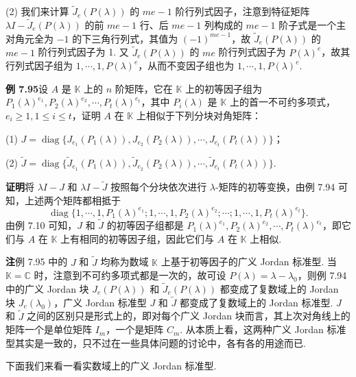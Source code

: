 \documentclass[UTF8, 12pt, fontset=fandol, oneside]{ctexart}
\begin{document}
(2) 我们来计算 $\widetilde J_e(P(\lambda))$ 的 $me-1$ 阶行列式因子，注意到特征矩阵 $\lambda I-\widetilde J_e(P(\lambda))$ 的前 $me-1$ 行、后 $me-1$ 列构成的 $me-1$ 阶子式是一个主对角元全为 $-1$ 的下三角行列式，其值为 $(-1)^{me-1}$，故 $\widetilde J_e(P(\lambda))$ 的 $me-1$ 阶行列式因子为 1. 又 $\widetilde J_e(P(\lambda))$ 的 $me$ 阶行列式因子为 $P(\lambda)^e$，故其行列式因子组为 $1,\cdots,1,P(\lambda)^e$，从而不变因子组也为 $1,\cdots,1,P(\lambda)^e$.

\noindent\textbf{例 7.95}\quad 设 $A$ 是 $\mathbb{K}$ 上的 $n$ 阶矩阵，它在 $\mathbb{K}$ 上的初等因子组为 $P_1(\lambda)^{e_1},P_2(\lambda)^{e_2},\cdots,P_t(\lambda)^{e_t}$，其中 $P_i(\lambda)$ 是 $\mathbb{K}$ 上的首一不可约多项式，$e_i\ge1,1\le i\le t$，证明 $A$ 在 $\mathbb{K}$ 上相似于下列分块对角矩阵：

(1) $J=\operatorname{diag}\{J_{e_1}(P_1(\lambda)),J_{e_2}(P_2(\lambda)),\cdots,J_{e_t}(P_t(\lambda))\}$；

(2) $\widetilde J=\operatorname{diag}\{\widetilde J_{e_1}(P_1(\lambda)),\widetilde J_{e_2}(P_2(\lambda)),\cdots,\widetilde J_{e_t}(P_t(\lambda))\}$.

\noindent\textbf{证明}\quad 将 $\lambda I-J$ 和 $\lambda I-\widetilde J$ 按照每个分块依次进行 $\lambda$-矩阵的初等变换，由例 7.94 可知，上述两个矩阵都相抵于
\[
\operatorname{diag}\{1,\cdots,1,P_1(\lambda)^{e_1};1,\cdots,1,P_2(\lambda)^{e_2};\cdots;1,\cdots,1,P_t(\lambda)^{e_t}\}.
\]
由例 7.10 可知，$J$ 和 $\widetilde J$ 的初等因子组都是 $P_1(\lambda)^{e_1},P_2(\lambda)^{e_2},\cdots,P_t(\lambda)^{e_t}$，即它们与 $A$ 在 $\mathbb{K}$ 上有相同的初等因子组，因此它们与 $A$ 在 $\mathbb{K}$ 上相似.

\noindent\textbf{注}\quad 例 7.95 中的 $J$ 和 $\widetilde J$ 均称为数域 $\mathbb{K}$ 上基于初等因子的广义 Jordan 标准型. 当 $\mathbb{K}=\mathbb{C}$ 时，注意到不可约多项式都是一次的，故可设 $P(\lambda)=\lambda-\lambda_0$，则例 7.94 中的广义 Jordan 块 $J_e(P(\lambda))$ 和 $\widetilde J_e(P(\lambda))$ 都变成了复数域上的 Jordan 块 $J_e(\lambda_0)$，广义 Jordan 标准型 $J$ 和 $\widetilde J$ 都变成了复数域上的 Jordan 标准型. $J$ 和 $\widetilde J$ 之间的区别只是形式上的，即对每个广义 Jordan 块而言，其上次对角线上的矩阵一个是单位矩阵 $I_m$，一个是矩阵 $C_m$. 从本质上看，这两种广义 Jordan 标准型其实是一致的，只不过在一些具体问题的讨论中，各有各的用途而已.

下面我们来看一看实数域上的广义 Jordan 标准型.
\end{document}
